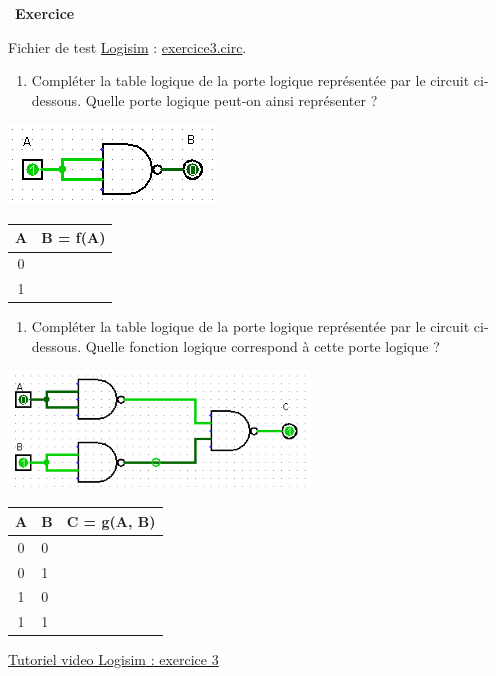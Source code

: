 \documentclass[
  11pt,
]{article}
\providecommand{\tightlist}{%
  \setlength{\itemsep}{0pt}\setlength{\parskip}{0pt}}
\newcounter{exo}
\newenvironment{exercice}[1]
{\par \medskip   \addtocounter{exo}{1} \noindent  
\begin{bclogo}[arrondi =0.1,   noborder = true, logo=\bccrayon, marge=4]{~\textbf{Exercice} \textbf{\theexo} {\itshape #1} }  \par}
{
\end{bclogo}
 \par \bigskip }
\newcounter{def}
\newcounter{logi}
\begin{document}
\begin{exercice}{}

Fichier de test \href{http://www.cburch.com/logisim/}{Logisim} :
\href{circuits_logisim/exercice3.circ}{exercice3.circ}.

\begin{enumerate}
\def\labelenumi{\arabic{enumi}.}
\tightlist
\item
  Compléter la table logique de la porte logique représentée par le
  circuit ci-dessous. Quelle porte logique peut-on ainsi représenter ?
\end{enumerate}

\includegraphics{images/porte_not_with_nand.png}\\

\begin{longtable}[]{@{}cl@{}}
\toprule
A & B = f(A)\tabularnewline
\midrule
\endhead
0 &\tabularnewline
1 &\tabularnewline
\bottomrule
\end{longtable}

\begin{enumerate}
\def\labelenumi{\arabic{enumi}.}
\setcounter{enumi}{1}
\tightlist
\item
  Compléter la table logique de la porte logique représentée par le
  circuit ci-dessous. Quelle fonction logique correspond à cette porte
  logique ?
\end{enumerate}

\includegraphics[width=0.6\textwidth,height=\textheight]{images/porte_or_with_nand.png}\\

\begin{longtable}[]{@{}cll@{}}
\toprule
A & B & C = g(A, B)\tabularnewline
\midrule
\endhead
0 & 0 &\tabularnewline
0 & 1 &\tabularnewline
1 & 0 &\tabularnewline
1 & 1 &\tabularnewline
\bottomrule
\end{longtable}

\href{videos/exercice3.mp4}{Tutoriel video Logisim : exercice 3}

\end{exercice}
\end{document}
